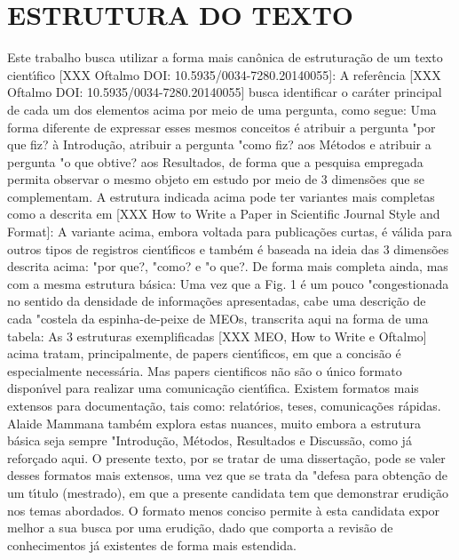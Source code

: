 \documentclass[
12pt,		%
openright,	%
twoside,  %
a4paper,			%
chapter=TITLE,		%
english,			%
french,				%
spanish,			%
brazil				%
]{USPSC-classe/USPSC}
\begin{document}
\chapter[ESTRUTURA DO TEXTO]{ESTRUTURA DO TEXTO}\label{ESTRUTURA DO TEXTO}
Este trabalho busca utilizar a forma mais can\^onica de estrutura\c{c}\~ao de um texto cient\'{\i}fico [XXX Oftalmo DOI: 10.5935/0034-7280.20140055]:
A refer\^encia [XXX Oftalmo DOI: 10.5935/0034-7280.20140055] busca identificar o car\'ater principal de cada um dos elementos acima por meio de uma pergunta, como segue:
Uma forma diferente de expressar esses mesmos conceitos \'e atribuir a pergunta "por que fiz? \`a Introdu\c{c}\~ao, atribuir a pergunta "como fiz? aos M\'etodos e atribuir a pergunta "o que obtive? aos Resultados, de forma que a pesquisa empregada permita observar o mesmo objeto em estudo por meio de 3 dimens\~oes que se complementam. 
A estrutura indicada acima pode ter variantes mais completas como a descrita em [XXX How to Write a Paper in Scientific Journal Style and Format]:
A variante acima, embora voltada para publica\c{c}\~oes curtas, \'e v\'alida para outros tipos de registros cient\'{\i}ficos e tamb\'em \'e baseada na ideia das 3 dimens\~oes descrita acima: "por que?, "como? e "o que?. 
De forma mais completa ainda, mas com a mesma estrutura b\'asica: 
Uma vez que a Fig. 1 \'e um pouco "congestionada no sentido da densidade de informa\c{c}\~oes apresentadas, cabe uma descri\c{c}\~ao de cada "costela da espinha-de-peixe de MEOs, transcrita aqui na forma de uma tabela:
As 3 estruturas exemplificadas [XXX MEO, How to Write e Oftalmo] acima tratam, principalmente, de papers cient\'{\i}ficos, em que a concis\~ao \'e especialmente necess\'aria. Mas papers cientificos n\~ao s\~ao o \'unico formato dispon\'{\i}vel para realizar uma comunica\c{c}\~ao cient\'{\i}fica. 
Existem formatos mais extensos para documenta\c{c}\~ao, tais como: relat\'orios, teses, comunica\c{c}\~oes r\'apidas. Alaide Mammana tamb\'em explora estas nuances, muito embora a estrutura b\'asica seja sempre "Introdu\c{c}\~ao, M\'etodos, Resultados e Discuss\~ao, como j\'a refor\c{c}ado aqui.
O presente texto, por se tratar de uma disserta\c{c}\~ao, pode se valer desses formatos mais extensos, uma vez que se trata da "defesa para obten\c{c}\~ao de um t\'{\i}tulo (mestrado), em que a presente candidata tem que demonstrar erudi\c{c}\~ao nos temas abordados. O formato menos conciso permite \`a esta candidata expor melhor a sua busca por uma erudi\c{c}\~ao, dado que comporta a revis\~ao de conhecimentos j\'a existentes de forma mais estendida.
\end{document}
